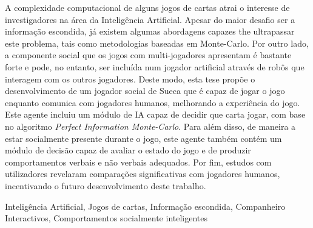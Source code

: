\begin{resumo}

A complexidade computacional de alguns jogos de cartas atrai o interesse de investigadores na área da Inteligência Artificial.
Apesar do maior desafio ser a informação escondida, já existem algumas abordagens capazes the ultrapassar este problema, tais como metodologias baseadas em Monte-Carlo.
Por outro lado, a componente social que os jogos com multi-jogadores apresentam é bastante forte e pode, no entanto, ser incluída num jogador artificial através de robôs que interagem com os outros jogadores.
Deste modo, esta tese propõe o desenvolvimento de um jogador social de Sueca que é capaz de jogar o jogo enquanto comunica com jogadores humanos, melhorando a experiência do jogo.
Este agente incluiu um módulo de IA capaz de decidir que carta jogar, com base no algoritmo \emph{Perfect Information Monte-Carlo}.
Para além disso, de maneira a estar socialmente presente durante o jogo, este agente também contém um módulo de decisão capaz de avaliar o estado do jogo e de produzir comportamentos verbais e não verbais adequados.
Por fim, estudos com utilizadores revelaram comparações significativas com jogadores humanos, incentivando o futuro desenvolvimento deste trabalho.
\end{resumo}

\begin{palavraschave}
Inteligência Artificial, Jogos de cartas, Informação escondida, Companheiro Interactivos, Comportamentos socialmente inteligentes
\end{palavraschave}

\clearpage
\thispagestyle{empty}
\cleardoublepage
